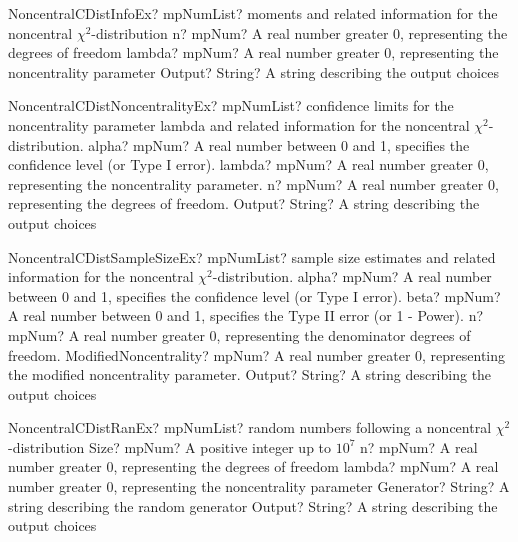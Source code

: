 \documentclass[12pt,a4paper,openany]{book}
\begin{document}
\begin{mpFunctionsExtract}
\mpFunctionThreeNotImplemented
{NoncentralCDistInfoEx? mpNumList? moments and related information for the noncentral $\chi^2$-distribution}
{n? mpNum? A real number greater 0, representing the degrees of freedom}
{lambda? mpNum? A real number greater 0, representing the noncentrality parameter}
{Output? String? A string describing the output choices}
\end{mpFunctionsExtract}

\begin{mpFunctionsExtract}
\mpFunctionFourNotImplemented
{NoncentralCDistNoncentralityEx? mpNumList? confidence limits for the noncentrality parameter lambda and related information for the noncentral $\chi^2$-distribution.}
{alpha? mpNum? A real number between 0 and 1, specifies the confidence level (or Type I error).}
{lambda? mpNum? A real number greater 0, representing the noncentrality parameter.}
{n? mpNum? A real number greater 0, representing the degrees of freedom.}
{Output? String? A string describing the output choices}
\end{mpFunctionsExtract}

\begin{mpFunctionsExtract}
\mpFunctionFiveNotImplemented
{NoncentralCDistSampleSizeEx? mpNumList? sample size estimates and related information for the noncentral $\chi^2$-distribution.}
{alpha? mpNum? A real number between 0 and 1, specifies the confidence level (or Type I error).}
{beta? mpNum?  A real number between 0 and 1, specifies the Type II error (or 1 - Power).}
{n? mpNum? A real number greater 0, representing the denominator degrees of freedom.}
{ModifiedNoncentrality? mpNum? A real number greater 0, representing the modified noncentrality parameter.}
{Output? String? A string describing the output choices}
\end{mpFunctionsExtract}

\begin{mpFunctionsExtract}
\mpFunctionFiveNotImplemented
{NoncentralCDistRanEx? mpNumList? random numbers following a noncentral $\chi^2$-distribution}
{Size? mpNum? A positive integer up to $10^7$}
{n? mpNum? A real number greater 0, representing the degrees of freedom}
{lambda? mpNum? A real number greater 0, representing the noncentrality parameter}
{Generator? String? A string describing the random generator}
{Output? String? A string describing the output choices}
\end{mpFunctionsExtract}
\end{document}
